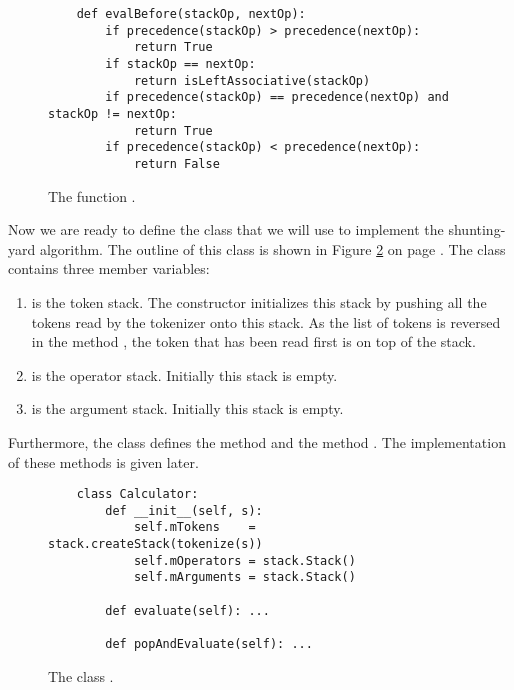 \begin{figure}[!ht]
\centering
\begin{verbatim}
    def evalBefore(stackOp, nextOp):
        if precedence(stackOp) > precedence(nextOp):
            return True
        if stackOp == nextOp:
            return isLeftAssociative(stackOp)
        if precedence(stackOp) == precedence(nextOp) and stackOp != nextOp:
            return True
        if precedence(stackOp) < precedence(nextOp):
            return False
\end{verbatim}
\vspace*{-0.3cm}
\caption{The function .}
\label{fig:evalBefore}
\end{figure}

Now we are ready to define the class  that we will use to implement the shunting-yard
algorithm.  The outline of this class is shown in Figure \ref{fig:Calculator.ipynb} on page
\pageref{fig:Calculator.ipynb}.  The class contains three member variables:
\begin{enumerate}
\item {} is the token stack.  The constructor initializes this stack by pushing all the tokens
      read by the tokenizer onto this stack.  As the list of tokens is reversed in the method
      , the token that has been read first is on top of the stack.
\item {} is the operator stack.  Initially this stack is empty.
\item {} is the argument stack.  Initially this stack is empty.
\end{enumerate}
Furthermore, the class defines the method  and the method .
The implementation of these methods is given later.

\begin{figure}[!ht]
  \centering
\begin{verbatim}
    class Calculator:
        def __init__(self, s):
            self.mTokens    = stack.createStack(tokenize(s))
            self.mOperators = stack.Stack()
            self.mArguments = stack.Stack()
  
        def evaluate(self): ...

        def popAndEvaluate(self): ...
\end{verbatim}
\vspace*{-0.3cm}
  \caption{The class .}
  \label{fig:Calculator.ipynb}
\end{figure} 

